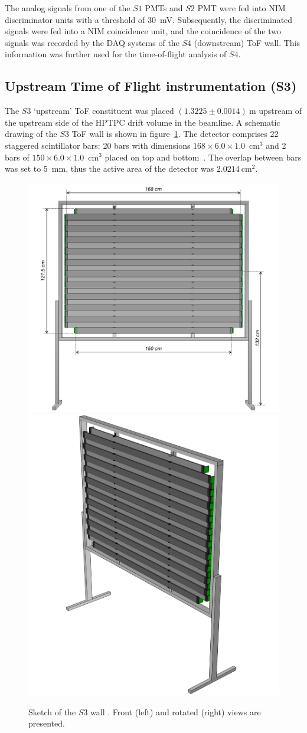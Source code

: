 The analog signals from one of the $\mathit{S1}$ PMTs and $\mathit{S2}$ PMT were fed into NIM discriminator units with a threshold of 30~mV.
Subsequently, the discriminated signals were fed into a NIM coincidence unit, and the coincidence of the two signals was recorded by the DAQ systems of the $\mathit{S4}$ (downstream) ToF wall.
This information was further used for the time-of-flight analysis of $\mathit{S4}$.

\subsection{Upstream Time of Flight instrumentation (S3)}
\label{subsec:s3Exp}
The $\mathit{S3}$ `upstream' ToF constituent was placed $(1.3225 \pm 0.0014)~\text{m}$ upstream of the upstream side of the HPTPC drift volume in the beamline.
A schematic drawing of the $\mathit{S3}$ ToF wall is shown in figure~\ref{fig:S3sketch}.
The detector comprises 22 staggered scintillator bars:  20 bars with dimensions $168 \times 6.0 \times 1.0$~cm$^3$ and 2 bars of  $150 \times 6.0 \times 1.0$~cm$^3$ placed on top and bottom~\cite{S3-proceedings}.
The overlap between bars was set to 5~mm, thus the active area of the detector was $2.0214~\text{cm}^{2}$.

\begin{figure}
  \centering
  \includegraphics[width=0.54\linewidth]{files/Figures/uToF_sketch.pdf}
  \hfill
  \includegraphics[width=0.43\linewidth]{files/Figures/uTOF_rot.pdf}
  \caption{Sketch of the $\mathit{S3}$ wall \cite{S3-proceedings}.
  Front (left) and rotated (right) views are presented.}
  \label{fig:S3sketch}
\end{figure}

